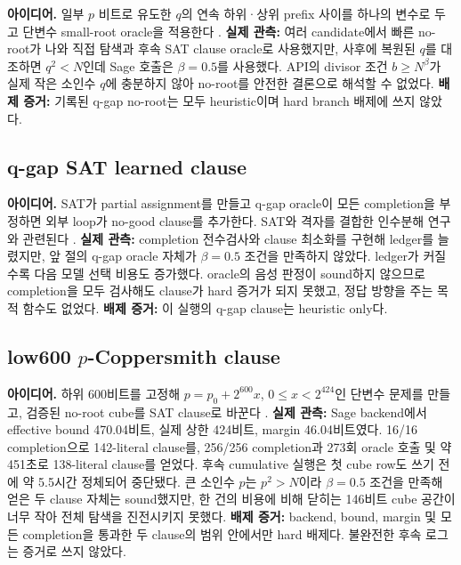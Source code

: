 \documentclass[10pt,a4paper]{article}
\newcommand{\evidence}[1]{\textbf{배제 증거:} #1}
\newcommand{\observed}[1]{\textbf{실제 관측:} #1}
\begin{document}
\textbf{아이디어.} 일부 \(p\) 비트로 유도한 \(q\)의 연속 하위·상위
prefix 사이를 하나의 변수로 두고 단변수 small-root oracle을 적용한다
\cite{coppersmith,howgrave-graham,sage-small-roots}.
\observed{여러 candidate에서 빠른 no-root가 나와 직접 탐색과 후속 SAT
clause oracle로 사용했지만, 사후에 복원된 \(q\)를 대조하면
\(q^2<N\)인데 Sage 호출은 \(\beta=0.5\)를 사용했다.}
API의 divisor 조건 \(b\ge N^\beta\)가 실제 작은 소인수 \(q\)에
충분하지 않아 no-root를 안전한 결론으로 해석할 수 없었다.
\evidence{기록된 q-gap no-root는 모두 heuristic이며 hard branch
배제에 쓰지 않았다.}

\subsection{q-gap SAT learned clause}

\textbf{아이디어.} SAT가 partial assignment를 만들고 q-gap oracle이
모든 completion을 부정하면 외부 loop가 no-good clause를 추가한다.
SAT와 격자를 결합한 인수분해 연구와 관련된다 \cite{ajani-bright}.
\observed{completion 전수검사와 clause 최소화를 구현해 ledger를
늘렸지만, 앞 절의 q-gap oracle 자체가 \(\beta=0.5\) 조건을 만족하지
않았다. ledger가 커질수록 다음 모델 선택 비용도 증가했다.}
oracle의 음성 판정이 sound하지 않으므로 completion을 모두 검사해도
clause가 hard 증거가 되지 못했고, 정답 방향을 주는 목적 함수도 없었다.
\evidence{이 실행의 q-gap clause는 heuristic only다.}

\subsection{low600 \texorpdfstring{\(p\)}{p}-Coppersmith clause}

\textbf{아이디어.} 하위 600비트를 고정해
\(p=p_0+2^{600}x\), \(0\le x<2^{424}\)인 단변수 문제를 만들고,
검증된 no-root cube를 SAT clause로 바꾼다
\cite{coppersmith,howgrave-graham,ajani-bright,sage-small-roots}.
\observed{Sage backend에서 effective bound 470.04비트, 실제 상한
424비트, margin 46.04비트였다. 16/16 completion으로 142-literal
clause를, 256/256 completion과 273회 oracle 호출 및 약 451초로
138-literal clause를 얻었다. 후속 cumulative 실행은 첫 cube row도
쓰기 전에 약 5.5시간 정체되어 중단됐다.}
큰 소인수 \(p\)는 \(p^2>N\)이라 \(\beta=0.5\) 조건을 만족해 얻은
두 clause 자체는 sound했지만, 한 건의 비용에 비해 닫히는 146비트 cube
공간이 너무 작아 전체 탐색을 진전시키지 못했다.
\evidence{backend, bound, margin 및 모든 completion을 통과한 두
clause의 범위 안에서만 hard 배제다. 불완전한 후속 로그는 증거로 쓰지
않았다.}
\end{document}
